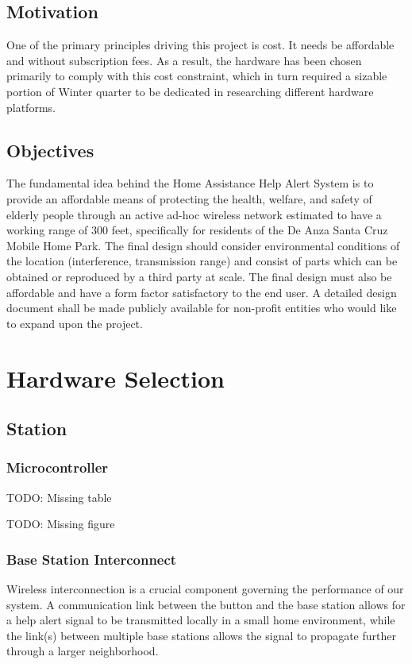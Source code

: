 \documentclass[journal]{IEEEtran}
\begin{document}
\subsection{Motivation}
One of the primary principles driving this project is cost.  It needs be affordable and without subscription fees.  As a result, the hardware has been chosen primarily to comply with this cost constraint, which in turn required a sizable portion of Winter quarter to be dedicated in researching different hardware platforms.

\subsection{Objectives}
The fundamental idea behind the Home Assistance Help Alert System is to provide an affordable means of protecting the health, welfare, and safety of elderly people through an active ad-hoc wireless network estimated to have a working range of 300 feet, specifically for residents of the De Anza Santa Cruz Mobile Home Park.  The final design should consider environmental conditions of the location (interference, transmission range) and consist of parts which can be obtained or reproduced by a third party at scale.  The final design must also be affordable and have a form factor satisfactory to the end user.  A detailed design document shall be made publicly available for non-profit entities who would like to expand upon the project.

\section{Hardware Selection}

\subsection{Station}

\subsubsection{Microcontroller}

TODO: Missing table

TODO: Missing figure

\subsubsection{Base Station Interconnect}

Wireless interconnection is a crucial component governing the performance of our system.  A communication link between the button and the base station allows for a help alert signal to be transmitted locally in a small home environment, while the link(s) between multiple base stations allows the signal to propagate further through a larger neighborhood.
\end{document}

